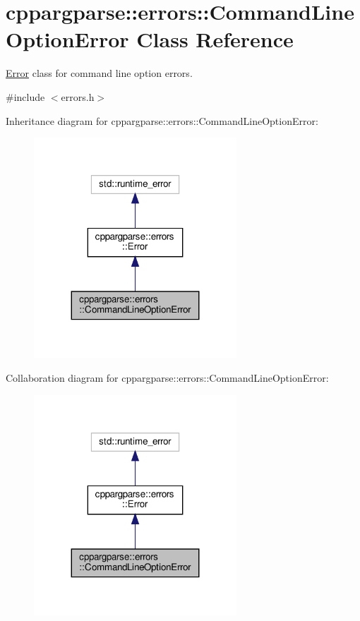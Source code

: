 \hypertarget{classcppargparse_1_1errors_1_1CommandLineOptionError}{}\section{cppargparse\+:\+:errors\+:\+:Command\+Line\+Option\+Error Class Reference}
\label{classcppargparse_1_1errors_1_1CommandLineOptionError}


\hyperlink{classcppargparse_1_1errors_1_1Error}{Error} class for command line option errors.  




{\ttfamily \#include $<$errors.\+h$>$}



Inheritance diagram for cppargparse\+:\+:errors\+:\+:Command\+Line\+Option\+Error\+:\nopagebreak
\begin{figure}[H]
\begin{center}
\leavevmode
\includegraphics[width=215pt]{classcppargparse_1_1errors_1_1CommandLineOptionError__inherit__graph}
\end{center}
\end{figure}


Collaboration diagram for cppargparse\+:\+:errors\+:\+:Command\+Line\+Option\+Error\+:\nopagebreak
\begin{figure}[H]
\begin{center}
\leavevmode
\includegraphics[width=215pt]{classcppargparse_1_1errors_1_1CommandLineOptionError__coll__graph}
\end{center}
\end{figure}
